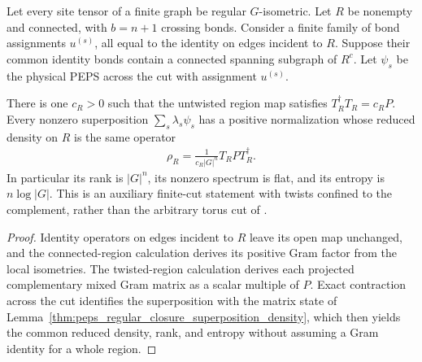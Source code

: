 \begin{lemma}%
    \label{thm:peps_regular_twisted_cut_entropy}
    \leanok
    Let every site tensor of a finite graph be regular $G$-isometric.
    Let $R$ be nonempty and connected, with $b=n+1$ crossing bonds.
    Consider a finite family of bond assignments $u^{(s)}$, all equal
    to the identity on edges incident to $R$. Suppose their common
    identity bonds contain a connected spanning subgraph of $R^c$.
    Let $\psi_s$ be the physical PEPS across the cut with
    assignment $u^{(s)}$.

    There is one $c_R>0$ such that the untwisted region map
    satisfies $T_R^\dagger T_R=c_RP$. Every nonzero superposition
    $\sum_s\lambda_s\psi_s$ has a positive normalization whose reduced
    density on $R$ is the same operator
    \begin{align}
        \rho_R=\frac{1}{c_R|G|^n}T_RPT_R^\dagger.
    \end{align}
    In particular its rank is $|G|^n$, its nonzero spectrum is flat,
    and its entropy is $n\log|G|$.
    This is an auxiliary finite-cut statement with twists confined to
    the complement, rather than the arbitrary torus cut of
    \cite[Theorem~6.9]{Schuch2010PEPS}
    \cite{gap:rmp_peps_quantum_double_g_isometry}.
\end{lemma}

\begin{proof}\leanok
    Identity operators on edges incident to $R$ leave its open
    map unchanged, and the connected-region calculation derives its positive
    Gram factor from the local isometries. The twisted-region calculation
    derives each projected complementary mixed Gram matrix as a scalar
    multiple of $P$. Exact contraction across the cut identifies the
    superposition with the matrix state of
    Lemma~\ref{thm:peps_regular_closure_superposition_density}, which then yields the common reduced density, rank, and entropy without assuming a Gram identity for a whole region.
\end{proof}


